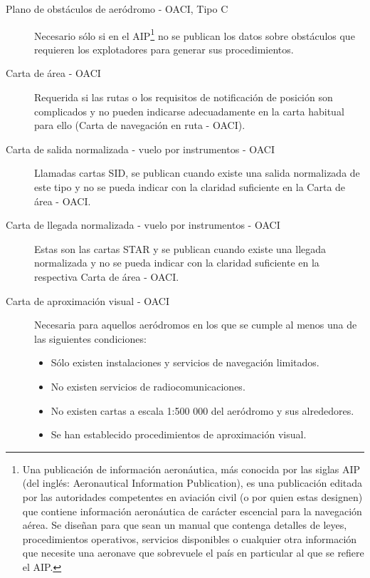 \documentclass[a4paper,12pt,twoside]{article}
\begin{document}
\begin{description}

\item [Plano de obst\'aculos de aer\'odromo - OACI, Tipo C] Necesario s\'olo
  si en el AIP\footnote{Una publicación de información aeronáutica, más conocida por las siglas AIP (del inglés: Aeronautical Information Publication), es una publicación editada por las autoridades competentes en aviación civil (o por quien estas designen) que contiene información aeronáutica de carácter escencial para la navegación aérea. Se diseñan para que sean un manual que contenga detalles de leyes, procedimientos operativos, servicios disponibles o cualquier otra información que necesite una aeronave que sobrevuele el país en particular al que se refiere el AIP.}
 no se publican los datos sobre obst\'aculos que requieren
  los explotadores para generar sus procedimientos.

  \item [Carta de \'area - OACI] Requerida si las rutas o los requisitos de
  notificaci\'on de posici\'on son complicados y no pueden indicarse
  adecuadamente en la carta habitual para ello (Carta de navegaci\'on en
  ruta - OACI).

  \item [Carta de salida normalizada - vuelo por instrumentos - OACI]
  Llamadas cartas SID, se publican cuando existe una salida
  normalizada de este tipo y no se pueda indicar con la claridad
  suficiente en la Carta de \'area - OACI.

  \item [Carta de llegada normalizada - vuelo por instrumentos - OACI]
  Estas son las cartas STAR y se publican cuando existe una llegada
  normalizada y no se pueda indicar con la claridad suficiente en la
  respectiva Carta de \'area - OACI.

  \item [Carta de aproximaci\'on visual - OACI] Necesaria para aquellos
  aer\'odromos en los que se cumple al menos una de las siguientes
  condiciones:

  \begin{itemize}
  \item  S\'olo existen instalaciones y servicios de navegaci\'on limitados.

    \item No existen servicios de radiocomunicaciones.

    \item No existen cartas a escala 1:500 000 del aer\'odromo y sus
    alrededores.

    \item Se han establecido procedimientos de aproximaci\'on visual.
  \end{itemize}

\end{description}
\end{document}

